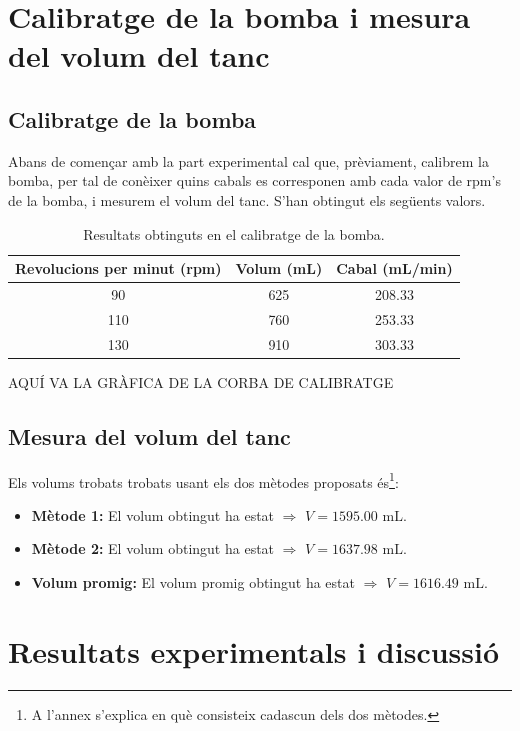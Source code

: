\documentclass[10pt, twoside]{article}
\begin{document}
\section{Calibratge de la bomba i mesura del volum del tanc}
\subsection{Calibratge de la bomba}
Abans de començar amb la part experimental cal que, prèviament, calibrem la bomba, per tal de conèixer quins cabals es corresponen amb cada valor de rpm's de la bomba, i mesurem el volum del tanc. S'han obtingut els següents valors.
\begin{table}[h!]
    \centering
    \caption{Resultats obtinguts en el calibratge de la bomba.}
    \label{tab1}
    \begin{tabular}{|c|c|c|} %
    \hline
    Revolucions per minut (rpm) & Volum (mL) & Cabal (mL/min) \\ \hline
    90       & 625       & 208.33       \\ \hline
    110      & 760       & 253.33       \\ \hline
    130      & 910       & 303.33       \\ \hline
    \end{tabular}
\end{table}
 AQUÍ VA LA GRÀFICA DE LA CORBA DE CALIBRATGE
 
\subsection{Mesura del volum del tanc}
Els volums trobats trobats usant els dos mètodes proposats és\footnote{A l'annex s'explica en què consisteix cadascun dels dos mètodes.}:
\begin{itemize}
    \item \textbf{Mètode 1: }El volum obtingut ha estat $\Rightarrow$ $\boxed{V = 1595.00 \text{ mL}}$.
    \item \textbf{Mètode 2: }El volum obtingut ha estat $\Rightarrow$ $\boxed{V = 1637.98 \text{ mL}}$.
    \item \textbf{Volum promig: }El volum promig obtingut ha estat $\Rightarrow$ $\boxed{V = 1616.49 \text{ mL}}$.
\end{itemize}

\section{Resultats experimentals i discussió}
\end{document}
